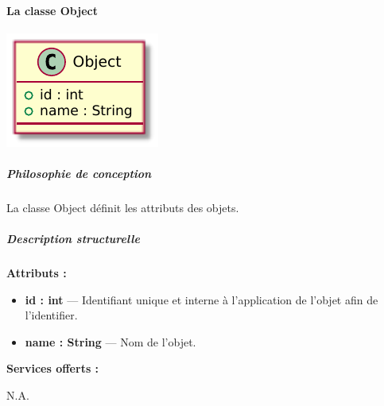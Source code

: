 \paragraph{La classe Object}

\begin{minipage}
    {\linewidth}
    \centering
    \includegraphics[width=0.80\linewidth]{../schemas/Conception_detaillee/classe_object.pdf}
\end{minipage}

\subparagraph{Philosophie de conception \newline} 

\medspace

La classe Object définit les attributs des objets. 

\subparagraph{Description structurelle \newline}

\medspace

\textbf{Attributs :}

\begin{itemize}
    \item \textbf{id : int} --- Identifiant unique et interne à l'application de l'objet afin de l'identifier. 
    \item \textbf{name : String } --- Nom de l'objet. 
\end{itemize}


\textbf{Services offerts :}

N.A.